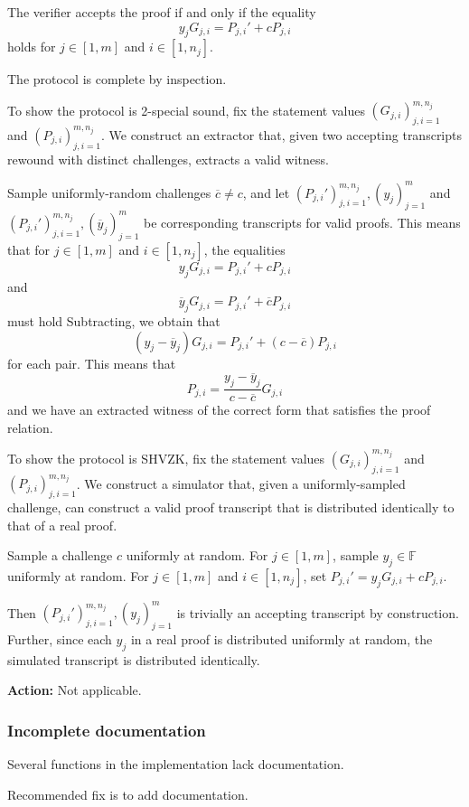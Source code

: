 \documentclass{article}
\begin{document}
The verifier accepts the proof if and only if the equality
$$y_j G_{j,i} = P_{j,i}' + cP_{j,i}$$
holds for $j \in [1,m]$ and $i \in [1,n_j]$.

The protocol is complete by inspection.

To show the protocol is 2-special sound, fix the statement values $(G_{j,i})_{j,i=1}^{m,n_j}$ and $(P_{j,i})_{j,i=1}^{m,n_j}$.
We construct an extractor that, given two accepting transcripts rewound with distinct challenges, extracts a valid witness.

Sample uniformly-random challenges $\overline{c} \neq c$, and let $(P_{j,i}')_{j,i=1}^{m,n_j}, (y_j)_{j=1}^m$ and $(P_{j,i}')_{j,i=1}^{m,n_j}, (\overline{y}_j)_{j=1}^m$ be corresponding transcripts for valid proofs.
This means that for $j \in [1,m]$ and $i \in [1,n_j]$, the equalities
$$y_j G_{j,i} = P_{j,i}' + cP_{j,i}$$
and
$$\overline{y}_j G_{j,i} = P_{j,i}' + \overline{c}P_{j,i}$$
must hold
Subtracting, we obtain that
$$(y_j - \overline{y}_j) G_{j,i} = P_{j,i}' + (c - \overline{c}) P_{j,i}$$
for each pair.
This means that
$$P_{j,i} = \frac{y_j - \overline{y}_j}{c - \overline{c}} G_{j,i}$$
and we have an extracted witness of the correct form that satisfies the proof relation.

To show the protocol is SHVZK, fix the statement values $(G_{j,i})_{j,i=1}^{m,n_j}$ and $(P_{j,i})_{j,i=1}^{m,n_j}$.
We construct a simulator that, given a uniformly-sampled challenge, can construct a valid proof transcript that is distributed identically to that of a real proof.

Sample a challenge $c$ uniformly at random.
For $j \in [1,m]$, sample $y_j \in \mathbb{F}$ uniformly at random.
For $j \in [1,m]$ and $i \in [1,n_j]$, set $P_{j,i}' = y_j G_{j,i} + cP_{j,i}$.

Then $(P_{j,i}')_{j,i=1}^{m,n_j}, (y_j)_{j=1}^m$ is trivially an accepting transcript by construction.
Further, since each $y_j$ in a real proof is distributed uniformly at random, the simulated transcript is distributed identically.

\textbf{Action:} Not applicable.


\subsubsection{Incomplete documentation}

Several functions in the implementation lack documentation.

Recommended fix is to add documentation.
\end{document}
